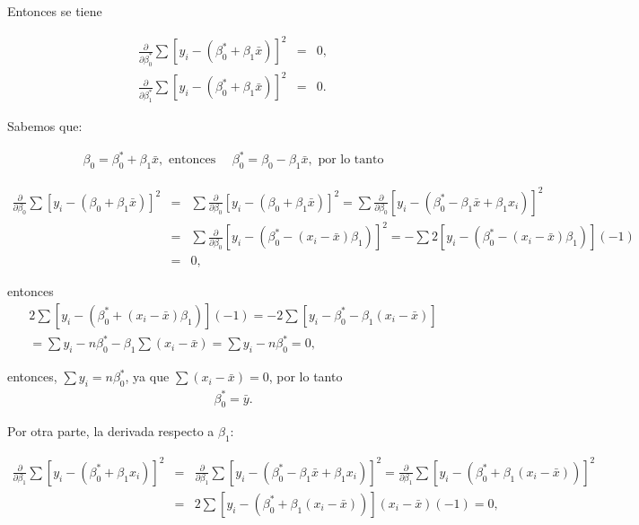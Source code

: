 \documentclass[12pt]{article}
\begin{document}
Entonces se tiene 

\begin{eqnarray*}
\frac{\partial}{\partial \beta_0^*} \sum \left[ y_i - (\beta_0^* + \beta_1 \bar{x}) \right]^2 &=& 0,\\
\frac{\partial}{\partial \beta_1^*} \sum \left[ y_i - (\beta_0^* + \beta_1 \bar{x}) \right]^2&=& 0.
\end{eqnarray*}

Sabemos que:

\begin{eqnarray*}
\beta_0 = \beta_0^* + \beta_1 \bar{x}, \textrm{ entonces }\quad \beta_0^* = \beta_0 - \beta_1 \bar{x},\textrm{ por lo tanto}
\end{eqnarray*}

\begin{eqnarray*}
\frac{\partial}{\partial \beta_0} \sum \left[ y_i - \left( \beta_0 + \beta_1 \bar{x} \right) \right]^2 &=&\sum \frac{\partial}{\partial \beta_0} \left[ y_i - (\beta_0 + \beta_1 \bar{x}) \right]^2
= \sum \frac{\partial}{\partial \beta_0} \left[ y_i - \left( \beta_0^* - \beta_1 \bar{x} + \beta_1 x_i \right) \right]^2\\
 &=& \sum \frac{\partial}{\partial \beta_0} \left[ y_i - \left( \beta_0^* - (x_i - \bar{x}) \beta_1 \right) \right]^2 = - \sum 2 \left[ y_i - \left( \beta_0^* - (x_i - \bar{x}) \beta_1 \right) \right](-1) \\
 &=&0,
\end{eqnarray*}

entonces
\begin{eqnarray*}
2 \sum \left[ y_i - \left( \beta_0^* + (x_i - \bar{x}) \beta_1 \right) \right] (-1) = -2 \sum \left[ y_i - \beta_0^* - \beta_1 (x_i - \bar{x}) \right] \\
=\sum y_i - n \beta_0^* - \beta_1 \sum (x_i - \bar{x}) =\sum y_i -n \beta_0^* =0,
\end{eqnarray*}

entonces, $ \sum y_i =n \beta_0^*$,  ya que $\sum (x_i - \bar{x}) = 0$, por lo tanto
\begin{eqnarray}
\beta_0^* = \bar{y}.
\end{eqnarray}

Por otra parte, la derivada respecto a $\beta_1$:

\begin{eqnarray*}
\frac{\partial}{\partial \beta_1} \sum \left[ y_i - \left( \beta_0^* + \beta_1 x_i \right) \right]^2 &=&\frac{\partial}{\partial \beta_1} \sum \left[ y_i - \left( \beta_0^* - \beta_1 \bar{x} + \beta_1 x_i \right) \right]^2 =\frac{\partial}{\partial \beta_1} \sum \left[ y_i - \left( \beta_0^* + \beta_1 (x_i - \bar{x}) \right) \right]^2\\
&=& 2 \sum \left[ y_i - \left( \beta_0^* + \beta_1 (x_i - \bar{x}) \right) \right](x_i - \bar{x}) (-1) = 0,
\end{eqnarray*}
\end{document}
